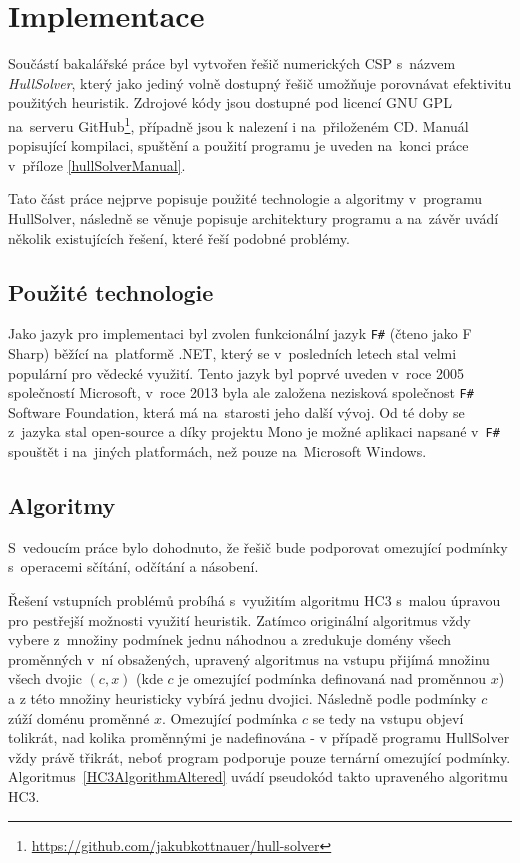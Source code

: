 



\chapter{Implementace}
Součástí bakalářské práce byl vytvořen řešič numerických CSP s~názvem \emph{HullSolver}, který jako jediný volně dostupný řešič umožňuje porovnávat efektivitu použitých heuristik. Zdrojové kódy jsou dostupné pod licencí GNU GPL na~serveru GitHub\footnote{\url{https://github.com/jakubkottnauer/hull-solver}}, případně jsou k nalezení i na~přiloženém CD. Manuál popisující kompilaci, spuštění a použití programu je uveden na~konci práce v~příloze \ref{hullSolverManual}.

Tato část práce nejprve popisuje použité technologie a algoritmy v~programu HullSolver, následně se věnuje popisuje architektury programu a na~závěr uvádí několik existujících řešení, které řeší podobné problémy.


\section{Použité technologie}
Jako jazyk pro implementaci byl zvolen funkcionální jazyk \texttt{F\#} (čteno jako F Sharp) běžící na~platformě .NET, který se v~posledních letech stal velmi populární pro vědecké využití. Tento jazyk byl poprvé uveden v~roce 2005 společností Microsoft, v~roce 2013 byla ale založena nezisková společnost \texttt{F\#} Software Foundation, která má na~starosti jeho další vývoj. Od té doby se z~jazyka stal open-source a díky projektu Mono je možné aplikaci napsané v~\texttt{F\#} spouštět i na~jiných platformách, než pouze na~Microsoft Windows.

\section{Algoritmy}

S~vedoucím práce bylo dohodnuto, že řešič bude podporovat omezující podmínky s~operacemi sčítání, odčítání a násobení.

Řešení vstupních problémů probíhá s~využitím algoritmu HC3 s~malou úpravou pro pestřejší možnosti využití heuristik. Zatímco originální algoritmus vždy vybere z~množiny podmínek jednu náhodnou a zredukuje domény všech proměnných v~ní obsažených, upravený algoritmus na vstupu přijímá množinu všech dvojic $(c, x)$ (kde $c$ je omezující podmínka definovaná nad proměnnou $x$) a z této množiny heuristicky vybírá jednu dvojici. Následně podle podmínky $c$ zúží doménu proměnné $x$. Omezující podmínka $c$ se tedy na vstupu objeví tolikrát, nad kolika proměnnými je nadefinována - v případě programu HullSolver vždy právě třikrát, neboť program podporuje pouze ternární omezující podmínky. Algoritmus~\ref{HC3AlgorithmAltered} uvádí pseudokód takto upraveného algoritmu HC3.

